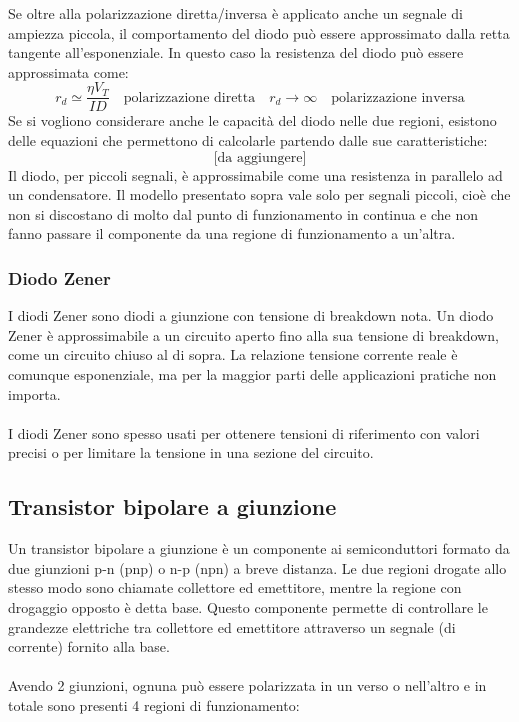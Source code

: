 \documentclass{article}
\begin{document}
Se oltre alla polarizzazione diretta/inversa è applicato anche un segnale di ampiezza piccola, il comportamento del diodo può essere approssimato dalla retta tangente all'esponenziale. In questo caso la resistenza del diodo può essere approssimata come:
$$ r_d \simeq \frac{\eta V_T}{ID} \quad \text{polarizzazione diretta} \quad r_d\rightarrow\infty \quad \text{polarizzazione inversa}$$
Se si vogliono considerare anche le capacità del diodo nelle due regioni, esistono delle equazioni che permettono di calcolarle partendo dalle sue caratteristiche:
$$ \text{[da aggiungere]} $$
Il diodo, per piccoli segnali, è approssimabile come una resistenza in parallelo ad un condensatore.
Il modello presentato sopra vale solo per segnali piccoli, cioè che non si discostano di molto dal punto di funzionamento in continua e che non fanno passare il componente da una regione di funzionamento a un'altra.


\subsubsection{Diodo Zener}
I diodi Zener sono diodi a giunzione con tensione di breakdown nota. Un diodo Zener è approssimabile a un circuito aperto fino alla sua tensione di breakdown, come un circuito chiuso al di sopra. La relazione tensione corrente reale è comunque esponenziale, ma per la maggior parti delle applicazioni pratiche non importa.\\\\
I diodi Zener sono spesso usati per ottenere tensioni di riferimento con valori precisi o per limitare la tensione in una sezione del circuito.

\subsection{Transistor bipolare a giunzione}
Un transistor bipolare a giunzione è un componente ai semiconduttori formato da due giunzioni p-n (pnp) o n-p (npn) a breve distanza. Le due regioni drogate allo stesso modo sono chiamate collettore ed emettitore, mentre la regione con drogaggio opposto è detta base. Questo componente permette di controllare le grandezze elettriche tra collettore ed emettitore attraverso un segnale (di corrente) fornito alla base.\\\\
Avendo 2 giunzioni, ognuna può essere polarizzata in un verso o nell'altro e in totale sono presenti 4 regioni di funzionamento:
\end{document}
